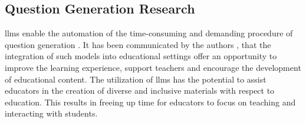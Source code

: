 \subsection{Question Generation Research}
\label{sec:question-generation-research}

\ac{llms} enable the automation of the time-consuming and demanding procedure of question generation \cite{vu_chatgpt-based_2024}. It has been communicated by the authors \cite{naveed_comprehensive_2024}, that the integration of such models into educational settings offer an opportunity to improve the learning experience, support teachers and encourage the development of educational content. The utilization of \ac{llms} has the potential to assist educators in the creation of diverse and inclusive materials with respect to education. This results in freeing up time for educators to focus on teaching and interacting with students.

